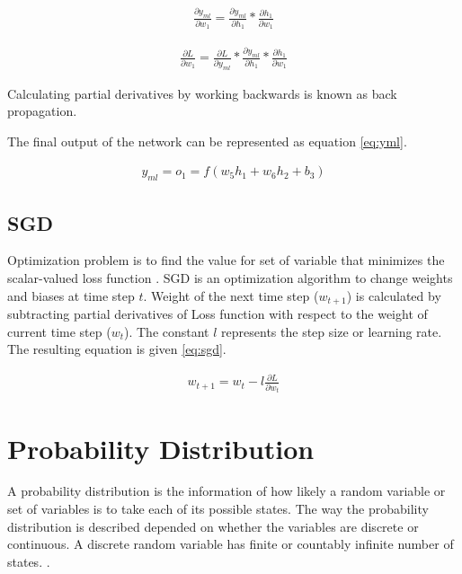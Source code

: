 \begin{align}
    \frac{\partial y_{ml}}{\partial w_1} = \frac{\partial y_{ml}}{\partial h_{1}} * \frac{\partial h_{1}}{\partial w_1}
    \label{eq:loss_partial2}
\end{align}

\begin{align}
    \frac{\partial L }{\partial w_1} = \frac{\partial L}{\partial y_{ml}} * \frac{\partial y_{ml}}{\partial h_{1}} * \frac{\partial h_{1}}{\partial w_1} \label{eq:backprop}
\end{align}

Calculating partial derivatives by working backwards is known as back propagation. 

The final output of the network can be represented as equation \ref{eq:yml}.

\begin{align}
   y_{ml} = o_1 = f(w_5h_1 + w_6h_2 + b_3)
    \label{eq:yml}
\end{align}

\subsection*{\acf{SGD}}

Optimization problem is to find the value for set of variable that minimizes the scalar-valued loss function \parencite[Page 273]{pml1Book}. \acs{SGD} is an optimization algorithm to change weights and biases at time step $t$. Weight of the next time step ($w_{t+1}$) is calculated by subtracting partial derivatives of Loss function with respect to the weight of current time step ($w_t$).  The constant $l$ represents the step size or learning rate. The resulting equation is given \ref{eq:sgd}.  

\begin{align}
 w_{t+1} = w_{t} - l \frac{\partial L }{\partial w_t} \label{eq:sgd}
\end{align}


\section{Probability Distribution}

A probability distribution is the information of how likely a random variable or set of variables is to take each of its possible states. The way the probability distribution is described depended on whether the variables are discrete or continuous. A discrete random variable has finite or countably infinite number of states. \parencite[Page 54]{Goodfellow-et-al-2016}.  

